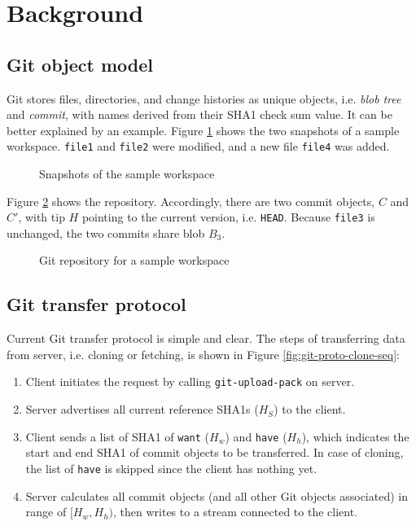 \documentclass[preprint]{sigplanconf}
\begin{document}
\section{Background}
\subsection{Git object model}
Git stores files, directories, and change histories as unique objects, i.e. \emph{blob} \emph{tree} and \emph{commit}, with names derived from their SHA1 check sum value\cite{gitobj}.
It can be better explained by an example.
Figure \ref{fig:workspace} shows the two snapshots of a sample workspace.
\verb|file1| and \verb|file2| were modified, and a new file \verb|file4| was added.
\begin{figure}
  \centering
  
  \caption{Snapshots of the sample workspace}
  \label{fig:workspace}
\end{figure}

Figure \ref{fig:git-repo} shows the repository.
Accordingly, there are two commit objects, $C$ and $C'$, with tip $H$ pointing to the current version, i.e. \verb|HEAD|.
Because \verb|file3| is unchanged, the two commits share blob $B_3$.

\begin{figure}[htpb]
  \centering
  
  \caption{Git repository for a sample workspace}
  \label{fig:git-repo}
\end{figure}
\subsection{Git transfer protocol}
Current Git transfer protocol is simple and clear.
The steps of transferring data from server, i.e. cloning or fetching, is shown in Figure \ref{fig:git-proto-clone-seq}:

\begin{enumerate}
  \item Client initiates the request by calling \verb|git-upload-pack| on server.
  \item Server advertises all current reference SHA1s ($H_S$) to the client.
  \item Client sends a list of SHA1 of \verb|want| ($H_w$) and \verb|have| ($H_h$), which indicates the start and end SHA1 of commit objects to be transferred.
    In case of cloning, the list of \verb|have| is skipped since the client has nothing yet.
  \item Server calculates all commit objects (and all other Git objects associated) in range of $[H_w, H_h)$, then writes to a stream connected to the client.
\end{enumerate}
\end{document}

